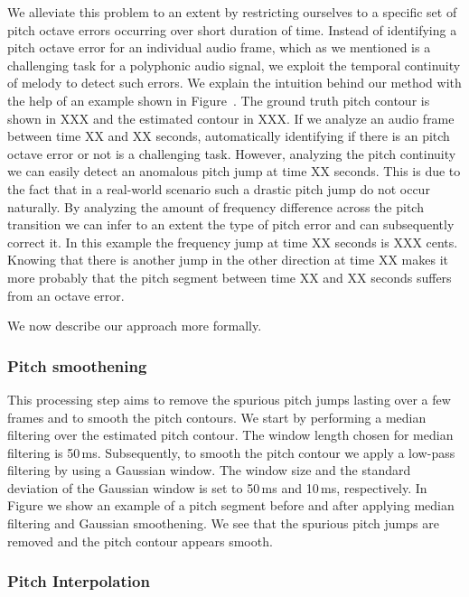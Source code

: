 {{We alleviate this problem to an extent by restricting ourselves to a specific set of pitch octave errors occurring over short duration of time. Instead of identifying a pitch octave error for an individual audio frame, which as we mentioned is a challenging task for a polyphonic audio signal, we exploit the temporal continuity of melody to detect such errors. We explain the intuition behind our method with the help of an example shown in Figure~. The ground truth pitch contour is shown in XXX and the estimated contour in XXX. If we analyze an audio frame between time XX and XX seconds, automatically identifying if there is an pitch octave error or not is a challenging task. However, analyzing the pitch continuity we can easily detect an anomalous pitch jump at time XX seconds. This is due to the fact that in a real-world scenario such a drastic pitch jump do not occur naturally. By analyzing the amount of frequency difference across the pitch transition we can infer to an extent the type of pitch error and can subsequently correct it. In this example the frequency jump at time XX seconds is XXX cents. Knowing that there is another jump in the other direction at time XX makes it more probably that the pitch segment between time XX and XX seconds suffers from an octave error. 

We now describe our approach more formally. 



\subsubsection{Pitch smoothening}
\label{sec:data_processing_pitch_smoothening}

This processing step aims to remove the spurious pitch jumps lasting over a few frames and to smooth the pitch contours. We start by performing a median filtering over the estimated pitch contour. The window length chosen for median filtering is 50\,ms. Subsequently, to smooth the pitch contour we apply a low-pass filtering by using a Gaussian window. The window size and the standard deviation of the Gaussian window is set to 50\,ms and 10\,ms, respectively. In Figure  we show an example of a pitch segment before and after applying median filtering and Gaussian smoothening. We see that the spurious pitch jumps are removed and the pitch contour appears smooth.


\subsubsection{Pitch Interpolation}
\label{sec:data_processing_pitch_interpolation}


}}
